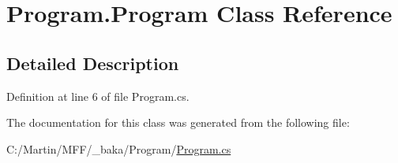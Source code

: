 \hypertarget{class_program_1_1_program}{}\section{Program.\+Program Class Reference}
\label{class_program_1_1_program}


\subsection{Detailed Description}


Definition at line 6 of file Program.\+cs.



The documentation for this class was generated from the following file\+:\begin{DoxyCompactItemize}
\item 
C\+:/\+Martin/\+M\+F\+F/\+\_\+baka/\+Program/\hyperlink{_program_2_program_8cs}{Program.\+cs}\end{DoxyCompactItemize}
